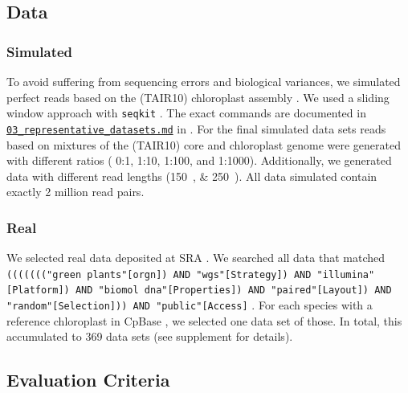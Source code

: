 \documentclass{bmcart}
\newcommand{\zenododataset}{\cite{zenododataset}}
\begin{document}
\subsection*{Data}
\subsubsection*{Simulated}
To avoid suffering from sequencing errors and biological variances, we simulated perfect reads based on the  (TAIR10) chloroplast assembly \cite{tair10}.
We used a sliding window approach with \texttt{seqkit} \cite{seqkit}. The exact commands are documented in \href{https://github.com/chloroExtractorTeam/benchmark/blob/master/03_representative_datasets.md}{\texttt{03\_representative\_datasets.md}} in \zenododataset{}.
For the final simulated data sets reads based on mixtures of the  (TAIR10) core and chloroplast genome were generated with different ratios ( \num{0}:\num{1}, \num{1}:\num{10}, \num{1}:\num{100}, and \num{1}:\num{1000}).
Additionally, we generated data with different read lengths (\SIlist{150;250}{\basepair}). All data simulated contain exactly 2 million read pairs.


\subsubsection*{Real}
We selected real data deposited at SRA \cite{sra2010}.
We searched all data that matched  \texttt{((((((("green plants"[orgn]) AND "wgs"[Strategy]) AND "illumina"[Platform]) AND "biomol dna"[Properties]) AND "paired"[Layout]) AND "random"[Selection])) AND "public"[Access]} \cite{sra_search_term}. 
For each species with a reference chloroplast in CpBase \cite{cpbase}, we selected one data set of those.
In total, this accumulated to \num{369} data sets (see supplement for details).

\subsection*{Evaluation Criteria}
\end{document}
